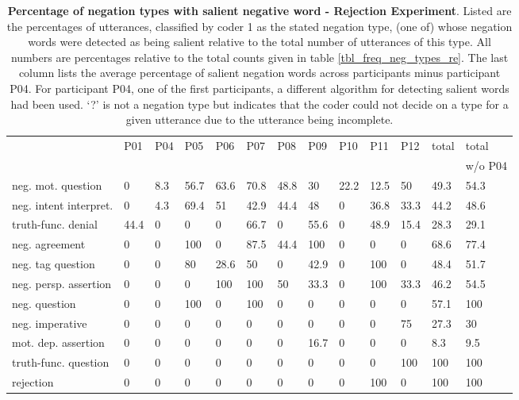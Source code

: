 \begin{screenonly}
\begin{table*}[h]
\caption{\textbf{Percentage of negation types with salient negative word - Rejection Experiment}. Listed are the percentages of utterances,
    classified by coder 1 as the stated negation type, (one of) whose negation words were detected as being salient relative to the total number
    of utterances of this type. All numbers are percentages relative to the total counts given in table \ref{tbl_freq_neg_types_re}. The last column lists the average
    percentage of salient negation words across participants minus participant P04. For participant P04, one of the first participants, a different
    algorithm for detecting salient words had been used. `?' is not a negation type but indicates that the coder could not decide on a type for a
    given utterance due to the utterance being incomplete.}
  \label{tbl_freq_sal_neg_types_re}
  \begin{tabular*}{\hsize}{@{\extracolsep{\fill}}lllllllllllll}
    \toprule
    & P01 & P04 & P05 & P06 & P07 & P08 & P09 & P10 & P11 & P12 & total & total\\
    & & & & & & & & & & & & w/o P04\\
    \midrule
    neg. mot. question & 0 & 8.3 & 56.7 & 63.6 & 70.8 & 48.8 & 30 & 22.2 & 12.5 & 50 & 49.3 & 54.3\\
    neg. intent interpret. & 0 & 4.3 & 69.4 & 51 & 42.9 & 44.4 & 48 & 0 & 36.8 & 33.3 & 44.2 & 48.6\\
    truth-func. denial & 44.4 & 0 & 0 & 0 & 66.7 & 0 & 55.6 & 0 & 48.9 & 15.4 & 28.3 & 29.1\\
    neg. agreement & 0 & 0 & 100 & 0 & 87.5 & 44.4 & 100 & 0 & 0 & 0 & 68.6 & 77.4\\
    neg. tag question & 0 & 0 & 80 & 28.6 & 50 & 0 & 42.9 & 0 & 100 & 0 & 48.4 & 51.7\\
    neg. persp. assertion & 0 & 0 & 0 & 100 & 100 & 50 & 33.3 & 0 & 100 & 33.3 & 46.2 & 54.5\\
    neg. question & 0 & 0 & 100 & 0 & 100 & 0 & 0 & 0 & 0 & 0 & 57.1 & 100\\
    neg. imperative & 0 & 0 & 0 & 0 & 0 & 0 & 0 & 0 & 0 & 75 & 27.3 & 30\\
    mot. dep. assertion & 0 & 0 & 0 & 0 & 0 & 0 & 16.7 & 0 & 0 & 0 & 8.3 & 9.5\\
    truth-func. question & 0 & 0 & 0 & 0 & 0 & 0 & 0 & 0 & 0 & 100 & 100 & 100\\
    rejection & 0 & 0 & 0 & 0 & 0 & 0 & 0 & 0 & 100 & 0 & 100 & 100\\

\end{tabular*}
\end{table*}
\end{screenonly}
